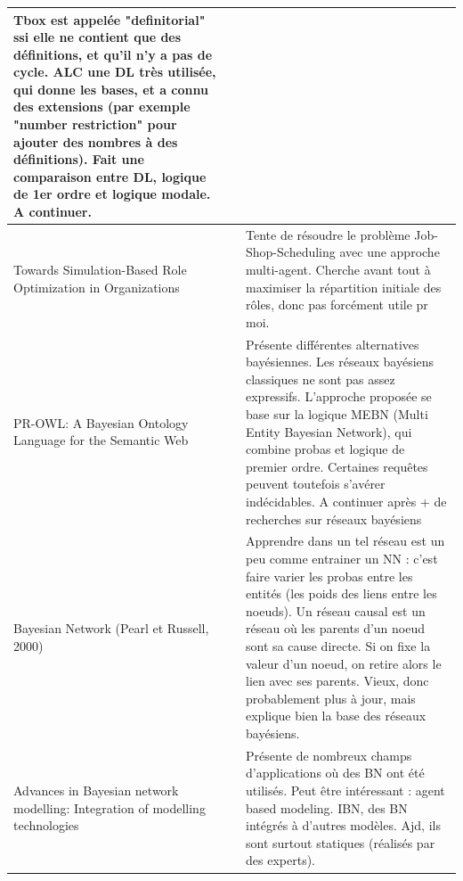 \documentclass[french]{report}
\begin{document}
\begin{table}[h]
\begin{center}
\begin{tabular}{|p{}|p{}|p{}|}
            Tbox est appelée "definitorial" ssi elle ne contient que des définitions, et qu'il n'y a pas de cycle.
            ALC une DL très utilisée, qui donne les bases, et a connu des extensions (par exemple "number restriction" pour ajouter des nombres à des définitions). Fait une comparaison entre DL, logique de 1er ordre et logique modale. A continuer.
            \\
            \hline
            Towards Simulation-Based Role Optimization in Organizations
            &
            & Tente de résoudre le problème Job-Shop-Scheduling avec une approche multi-agent. Cherche avant tout à maximiser la répartition initiale des rôles, donc pas forcément utile pr moi.\\
            \hline
            PR-OWL: A Bayesian Ontology Language for the Semantic Web
            &
            & Présente différentes alternatives bayésiennes. Les réseaux bayésiens classiques ne sont pas assez expressifs. L'approche proposée se base sur la logique MEBN (Multi Entity Bayesian Network), qui combine probas et logique de premier ordre. Certaines requêtes peuvent toutefois s'avérer indécidables. A continuer après + de recherches sur réseaux bayésiens\\
            \hline
            Bayesian Network (Pearl et Russell, 2000)
            &
            & Apprendre dans un tel réseau est un peu comme entrainer un NN : c'est faire varier les probas entre les entités (les poids des liens entre les noeuds). Un réseau causal est un réseau où les parents d'un noeud sont sa cause directe. Si on fixe la valeur d'un noeud, on retire alors le lien avec ses parents. Vieux, donc probablement plus à jour, mais explique bien la base des réseaux bayésiens.
            \\
            \hline
            Advances in Bayesian network modelling: Integration of modelling technologies
            &
            & Présente de nombreux champs d'applications où des BN ont été utilisés. Peut être intéressant : agent based modeling. IBN, des BN intégrés à d'autres modèles. Ajd, ils sont surtout statiques (réalisés par des experts).
            \\
            \hline


        \end{tabular}
    \end{center}
    \end{table}
\end{document}
